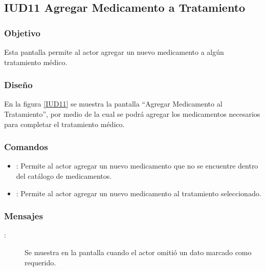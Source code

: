 \subsection{IUD11 Agregar Medicamento a Tratamiento}
 
\subsubsection{Objetivo}

    Esta pantalla permite al actor agregar un nuevo medicamento a algún tratamiento médico.

\subsubsection{Diseño}

    En la figura \ref{IUD11} se muestra la pantalla ``Agregar Medicamento al Tratamiento'', por medio de la cual se podrá agregar los medicamentos necesarios para completar el tratamiento médico. \\


\subsubsection{Comandos}
\begin{itemize}
    \item {}: Permite al actor agregar un nuevo medicamento que no se encuentre dentro del catálogo de medicamentos.
    \item {}: Permite al actor agregar un nuevo medicamento al tratamiento seleccionado.
\end{itemize}

\subsubsection{Mensajes}

\begin{description}
    \item[:] Se muestra en la pantalla  cuando el actor omitió un dato marcado como requerido.
   
\end{description}
